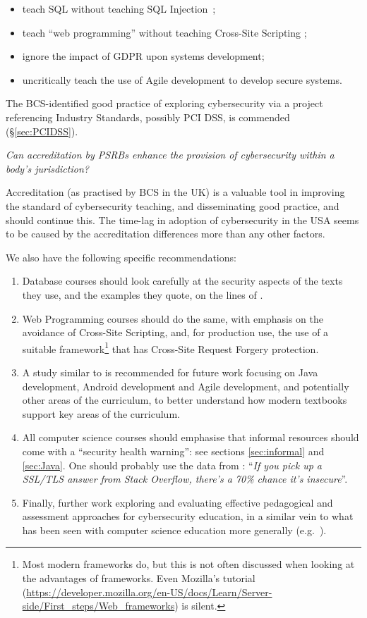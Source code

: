 \documentclass[conference]{IEEEtran}
\begin{document}
{\begin{description}
\begin{itemize}
	\item teach SQL without teaching SQL Injection~\cite{Drop2019};
	\item teach ``web programming'' without teaching Cross-Site Scripting \cite[(XSS)]{OWASP2017a};
	\item ignore the  impact of GDPR upon systems development;
	\item uncritically teach the use of Agile development to develop secure systems.
\end{itemize}

The BCS-identified good practice of exploring cybersecurity via a project referencing Industry Standards, possibly PCI DSS, is commended (\S\ref{sec:PCIDSS}).

\item[RQ3:] {\emph{Can accreditation by PSRBs enhance the provision of cybersecurity within a body's jurisdiction?}}

Accreditation (as practised by BCS in the UK) is a valuable tool in improving the standard of cybersecurity teaching, and disseminating good practice, and should continue this. The time-lag in adoption of cybersecurity in the USA seems to be caused by the accreditation differences more than any other factors.
\end{description}

We also have the following specific recommendations:

\begin{enumerate}
\item Database courses should look carefully at the security aspects of the texts they use, and the examples they quote, on the lines of \cite{Drop2019}.
\item Web Programming courses should  do the same, with emphasis on the avoidance of Cross-Site Scripting, and, for production use, the use of a suitable framework\footnote{Most modern frameworks do, but this is not often discussed when looking at the advantages of frameworks. Even Mozilla's tutorial (\url{https://developer.mozilla.org/en-US/docs/Learn/Server-side/First_steps/Web_frameworks}) is silent.} that has Cross-Site Request Forgery protection. 
\item A study similar to \cite{Drop2019} is recommended for future work focusing on Java development, Android development and Agile development, and potentially other areas of the curriculum, to better understand how modern textbooks support key areas of the curriculum.
\item All computer science courses should emphasise that informal resources should come with a ``security health warning'': see sections \ref{sec:informal} and \ref{sec:Java}. One should probably use the data from \cite{Chenetal2019a}: ``{\emph{If you pick up a SSL/TLS answer from Stack Overflow, there's a 70\% chance it's insecure}}''.
\item Finally, further work exploring and evaluating effective pedagogical and assessment approaches for cybersecurity education, in a similar vein to what has been seen with computer science education more generally (e.g.~\cite{davenport-et-al:latice2016}).
\end{enumerate}

}
\end{document}
